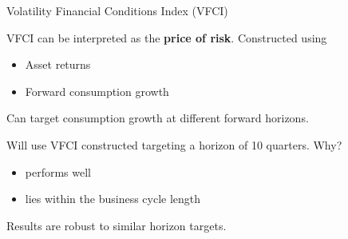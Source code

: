 \begin{frame}{Volatility Financial Conditions Index (VFCI)}
  \label{vfci}

  \vspace{0.25cm}
  
  VFCI can be interpreted as the \textbf{price of risk}.  Constructed using 
  
  \begin{itemize}
    \item Asset returns
    \item Forward consumption growth
  \end{itemize}
  \vspace{0.1cm}

  Can target consumption growth at different forward horizons.

  \vspace{0.25cm}

  Will use VFCI constructed targeting a horizon of 10 quarters.  Why?
  \begin{itemize}
    \item performs well
    \item lies within the business cycle length
  \end{itemize}
  \vspace{0.1cm}

  Results are robust to similar horizon targets.

\end{frame}